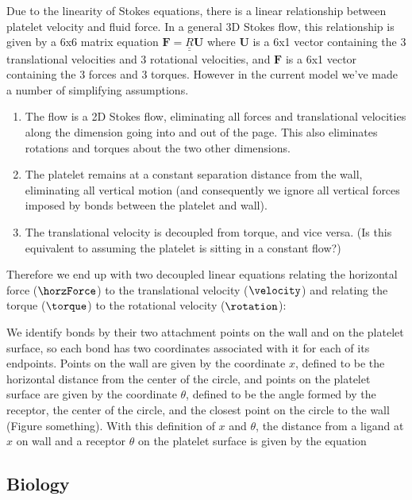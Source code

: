 Due to the linearity of Stokes equations, there is a linear
relationship between platelet velocity and fluid force. In a general
3D Stokes flow, this relationship is given by a 6x6 matrix equation
$\mathbf{F} = \underline{\underline{R}} \mathbf{U}$ where $\mathbf{U}$
is a 6x1 vector containing the 3 translational velocities and 3
rotational velocities, and $\mathbf{F}$ is a 6x1 vector containing the
3 forces and 3 torques. However in the current model we've made a
number of simplifying assumptions. 
\begin{enumerate}
\item The flow is a 2D Stokes flow, eliminating all forces and
  translational velocities along the dimension going into and out of
  the page. This also eliminates rotations and torques about the two
  other dimensions.
\item The platelet remains at a constant separation distance from the
  wall, eliminating all vertical motion (and consequently we ignore
  all vertical forces imposed by bonds between the platelet and
  wall).
\item The translational velocity is decoupled from torque, and vice
  versa. (Is this equivalent to assuming the platelet is sitting in a
  constant flow?)
\end{enumerate}
Therefore we end up with two decoupled linear equations relating the
horizontal force ($\horzForce$) to the translational velocity
($\velocity$) and relating the torque ($\torque$) to the rotational
velocity ($\rotation$):

We identify bonds by their two attachment points on the wall and on
the platelet surface, so each bond has two coordinates associated with
it for each of its endpoints. Points on the wall are given by the
coordinate $x$, defined to be the horizontal distance from the center
of the circle, and points on the platelet surface are given by the
coordinate $\theta$, defined to be the angle formed by the receptor,
the center of the circle, and the closest point on the circle to the
wall (Figure something). With this definition of $x$ and $\theta$, the
distance from a ligand at $x$ on wall and a receptor $\theta$ on the
platelet surface is given by the equation

\subsection{Biology}
\label{sec:biology}

